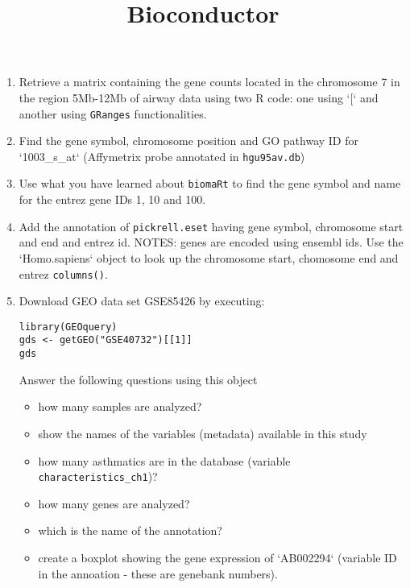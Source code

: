 \documentclass[11pt]{article}
\begin{document}
\title{\bf Bioconductor}
\date{}


\maketitle



\begin{enumerate}
\item Retrieve a matrix containing the gene counts located in the chromosome 7 in the region 5Mb-12Mb of airway data using  two R code: one using `[` and another using {\tt GRanges} functionalities.  

\item Find the gene symbol, chromosome position and GO pathway
ID for `1003\_s\_at` (Affymetrix probe annotated in {\tt hgu95av.db})

\item Use what you have learned about {\tt biomaRt} to find the gene symbol and name for the entrez gene IDs 1, 10 and 100.

\item Add the annotation of {\tt pickrell.eset} having gene symbol, chromosome start and end and entrez id. NOTES: genes are encoded using ensembl ids. Use the `Homo.sapiens` object to look up the chromosome start, chomosome end and entrez {\tt columns()}.

\item Download GEO data set GSE85426 by executing:

\begin{verbatim}
library(GEOquery)
gds <- getGEO("GSE40732")[[1]]
gds
\end{verbatim} 

Answer the following questions using this object
\begin{itemize}
\item how many samples are analyzed?
\item show the names of the variables (metadata) available in this study
\item how many asthmatics are in the database (variable {\tt characteristics\_ch1})?
\item how many genes are analyzed?
\item which is the name of the annotation?
\item create a boxplot showing the gene expression of `AB002294` (variable ID in the annoation - these are genebank numbers).
\end{itemize}

\end{enumerate}
\end{document}
